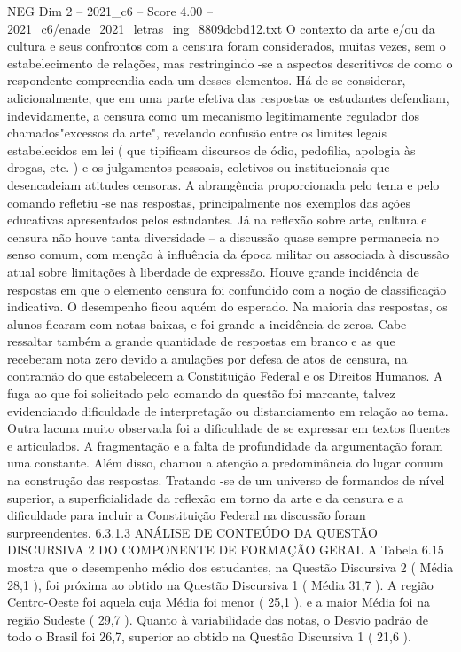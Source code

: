 \begin{textsample}{NEG Dim 2 – 2021\_c6 – Score 4.00 – 2021\_c6/enade\_2021\_letras\_ing\_8809dcbd12.txt}
O contexto da arte e/ou da cultura e seus confrontos com a censura foram considerados, muitas vezes, sem o estabelecimento de relações, mas restringindo -se a aspectos descritivos de como o respondente compreendia cada um desses elementos.
Há de se considerar, adicionalmente, que em uma parte efetiva das respostas os estudantes defendiam, indevidamente, a censura como um mecanismo legitimamente regulador dos chamados"excessos da arte", revelando confusão entre os limites legais estabelecidos em lei ( que tipificam discursos de ódio, pedofilia, apologia às drogas, etc. ) e os julgamentos pessoais, coletivos ou institucionais que desencadeiam atitudes censoras.
A abrangência proporcionada pelo tema e pelo comando refletiu -se nas respostas, principalmente nos exemplos das ações educativas apresentados pelos estudantes.
Já na reflexão sobre arte, cultura e censura não houve tanta diversidade – a discussão quase sempre permanecia no senso comum, com menção à influência da época militar ou associada à discussão atual sobre limitações à liberdade de expressão.
Houve grande incidência de respostas em que o elemento censura foi confundido com a noção de classificação indicativa.
O desempenho ficou aquém do esperado.
Na maioria das respostas, os alunos ficaram com notas baixas, e foi grande a incidência de zeros.
Cabe ressaltar também a grande quantidade de respostas em branco e as que receberam nota zero devido a anulações por defesa de atos de censura, na contramão do que estabelecem a Constituição Federal e os Direitos Humanos.
A fuga ao que foi solicitado pelo comando da questão foi marcante, talvez evidenciando dificuldade de interpretação ou distanciamento em relação ao tema.
Outra lacuna muito observada foi a dificuldade de se expressar em textos fluentes e articulados.
A fragmentação e a falta de profundidade da argumentação foram uma constante.
Além disso, chamou a atenção a predominância do lugar comum na construção das respostas.
Tratando -se de um universo de formandos de nível superior, a superficialidade da reflexão em torno da arte e da censura e a dificuldade para incluir a Constituição Federal na discussão foram surpreendentes. 6.3.1.3 ANÁLISE DE CONTEÚDO DA QUESTÃO DISCURSIVA 2 DO COMPONENTE DE FORMAÇÃO GERAL A Tabela 6.15 mostra que o desempenho médio dos estudantes, na Questão Discursiva 2 ( Média 28,1 ), foi próxima ao obtido na Questão Discursiva 1 ( Média 31,7 ).
A região Centro-Oeste foi aquela cuja Média foi menor ( 25,1 ), e a maior Média foi na região Sudeste ( 29,7 ).
Quanto à variabilidade das notas, o Desvio padrão de todo o Brasil foi 26,7, superior ao obtido na Questão Discursiva 1 ( 21,6 ).

\end{textsample}

